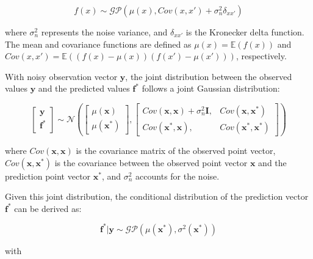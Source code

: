 \documentclass[a4paper,fleqn,numbers,sort&compress]{cas-sc}
\begin{document}
\begin{equation}
\label{eq:gaussian-process-noise}
    f(x) \sim \mathcal{GP}(\mu(x), Cov(x, x') + \sigma_n^2 \delta_{xx'})
\end{equation}

where \( \sigma_n^2 \) represents the noise variance, and \( \delta_{xx'} \) is the Kronecker delta function. The mean and covariance functions are defined as $\mu(x) = \mathbb{E}(f(x))$ and $Cov(x, x') = \mathbb{E}((f(x) - \mu(x))(f(x') - \mu(x')))$, respectively.

With noisy observation vector $\boldsymbol{y}$, the joint distribution between the observed values $\boldsymbol{y}$ and the predicted values $\boldsymbol{f^*}$ follows a joint Gaussian distribution:

\begin{equation}
\label{eq:joint-gaussian-noise}
    \begin{bmatrix} \boldsymbol{y} \\ \boldsymbol{f^*} \end{bmatrix} \sim \mathcal{N} \left( \begin{bmatrix} \mu(\boldsymbol{x}) \\ \mu(\boldsymbol{x^*}) \end{bmatrix}, \begin{bmatrix} Cov(\boldsymbol{x}, \boldsymbol{x}) + \sigma_n^2 \mathbf{I}, & Cov(\boldsymbol{x}, \boldsymbol{x^*}) \\ Cov(\boldsymbol{x^*}, \boldsymbol{x}), & Cov(\boldsymbol{x^*}, \boldsymbol{x^*}) \end{bmatrix} \right)
\end{equation}

where $ Cov(\boldsymbol{x}, \boldsymbol{x}) $ is the covariance matrix of the observed point vector, $ Cov(\boldsymbol{x}, \boldsymbol{x^*}) $ is the covariance between the observed point vector $ \boldsymbol{x} $ and the prediction point vector $ \boldsymbol{x^*} $, and $ \sigma_n^2 $ accounts for the noise.

Given this joint distribution, the conditional distribution of the prediction vector $ \boldsymbol{f^*} $ can be derived as:

\begin{equation}
\label{eq:conditional-gaussian-noise}
    \boldsymbol{f^*} | \boldsymbol{y} \sim \mathcal{GP}(\mu(\boldsymbol{x^*}), \sigma^2(\boldsymbol{x^*}))
\end{equation}

with
\end{document}
